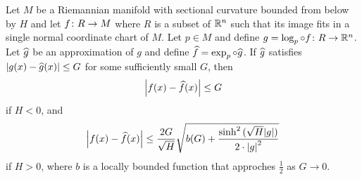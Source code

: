 \documentclass[english, a4paper, 12pt]{article}
\begin{document}
\begin{theorem}
	Let $M$ be a Riemannian manifold with sectional curvature bounded from below by $H$ and let $f \colon R \to M$ where $R$ is a subset of $\mathbb{R}^n$ such that its image fits in a single normal coordinate chart of $M$.
	Let $p \in M$ and define $g = \operatorname{log}_p \circ f \colon R \to \mathbb{R}^n$.
	Let $\widehat{g}$ be an approximation of $g$ and define $\widehat{f} = \operatorname{exp}_p \circ \widehat{g}$.
	If $\widehat{g}$ satisfies $\abs{g(x) - \widehat{g}(x)} \leq G$ for some sufficiently small $G$, then
	\begin{align}
		\abs{f(x) - \widehat{f}(x)} \leq G
	\end{align}
	if $H < 0$, and
	\begin{align}
		\abs{f(x) - \widehat{f}(x)} \leq \frac{2 G}{\sqrt{H}} \sqrt{b(G) + \frac{\sinh^2{(\sqrt{H} \abs{g})}}{2 \cdot \abs{g}^2}}
	\end{align}
	if $H > 0$, where $b$ is a locally bounded function that approches $\frac{1}{2}$ as $G \to 0$.
\end{theorem}
\end{document}
